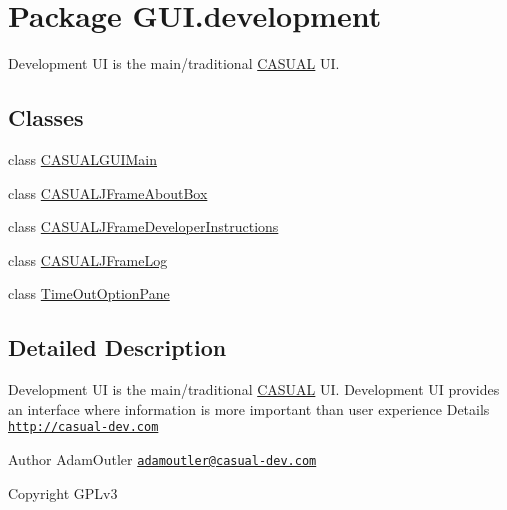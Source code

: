 \hypertarget{namespace_g_u_i_1_1development}{\section{Package G\-U\-I.\-development}
\label{namespace_g_u_i_1_1development}
}


Development U\-I is the main/traditional \hyperlink{namespace_c_a_s_u_a_l}{C\-A\-S\-U\-A\-L} U\-I.  


\subsection*{Classes}
\begin{DoxyCompactItemize}
\item 
class \hyperlink{class_g_u_i_1_1development_1_1_c_a_s_u_a_l_g_u_i_main}{C\-A\-S\-U\-A\-L\-G\-U\-I\-Main}
\item 
class \hyperlink{class_g_u_i_1_1development_1_1_c_a_s_u_a_l_j_frame_about_box}{C\-A\-S\-U\-A\-L\-J\-Frame\-About\-Box}
\item 
class \hyperlink{class_g_u_i_1_1development_1_1_c_a_s_u_a_l_j_frame_developer_instructions}{C\-A\-S\-U\-A\-L\-J\-Frame\-Developer\-Instructions}
\item 
class \hyperlink{class_g_u_i_1_1development_1_1_c_a_s_u_a_l_j_frame_log}{C\-A\-S\-U\-A\-L\-J\-Frame\-Log}
\item 
class \hyperlink{class_g_u_i_1_1development_1_1_time_out_option_pane}{Time\-Out\-Option\-Pane}
\end{DoxyCompactItemize}


\subsection{Detailed Description}
Development U\-I is the main/traditional \hyperlink{namespace_c_a_s_u_a_l}{C\-A\-S\-U\-A\-L} U\-I. Development U\-I provides an interface where information is more important than user experience Details \href{http://casual-dev.com}{\tt http\-://casual-\/dev.\-com} \begin{DoxyAuthor}{Author}
Adam\-Outler \href{mailto:adamoutler@casual-dev.com}{\tt adamoutler@casual-\/dev.\-com} 
\end{DoxyAuthor}
\begin{DoxyCopyright}{Copyright}
G\-P\-Lv3 
\end{DoxyCopyright}
